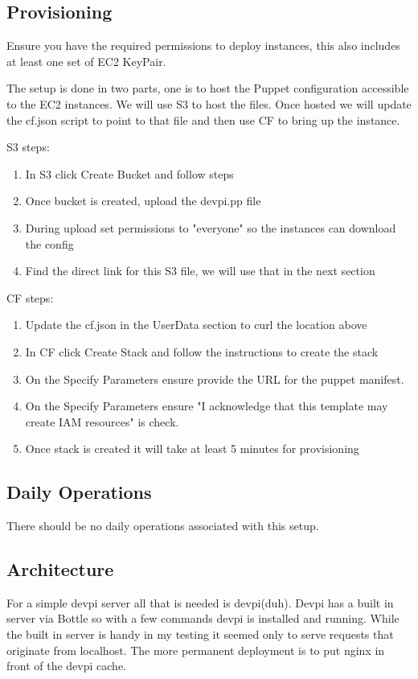 \documentclass[12pt, letterpaper]{article}
\begin{document}
\subsection{Provisioning}
Ensure you have the required permissions to deploy instances, this also includes at least one set of EC2 KeyPair.

The setup is done in two parts, one is to host the Puppet configuration accessible to the EC2 instances. We will use
S3 to host the files. Once hosted we will update the cf.json script to point to that file and then use CF to bring
up the instance.

S3 steps:
\begin{enumerate}
    \item In S3 click Create Bucket and follow steps
    \item Once bucket is created, upload the devpi.pp file
    \item During upload set permissions to "everyone" so the instances can download the config
    \item Find the direct link for this S3 file, we will use that in the next section
\end{enumerate}

CF steps:
\begin{enumerate}
    \item Update the cf.json in the UserData section to curl the location above
    \item In CF click Create Stack and follow the instructions to create the stack
    \item On the Specify Parameters ensure provide the URL for the puppet manifest.  
    \item On the Specify Parameters ensure "I acknowledge that this template may create IAM resources" is check.  
    \item Once stack is created it will take at least 5 minutes for provisioning
\end{enumerate}

\subsection{Daily Operations}
There should be no daily operations associated with this setup.


\subsection{Architecture}
For a simple devpi server all that is needed is devpi(duh). Devpi has a built in server via Bottle so with a few
commands devpi is installed and running. While the built in server is handy in my testing it seemed only to
serve requests that originate from localhost. The more permanent deployment is to put nginx in front of the
devpi cache.
\end{document}
